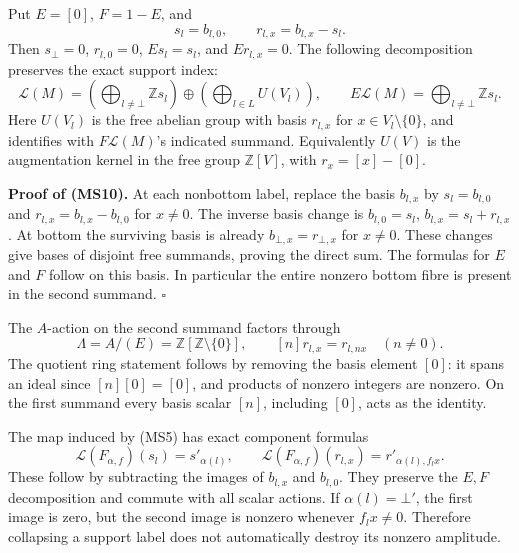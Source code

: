 \documentclass[
]{article}
\begin{document}
Put \(E=[0]\), \(F=1-E\), and \[
s_l=b_{l,0},\qquad r_{l,x}=b_{l,x}-s_l.
\tag{MS9}
\] Then \(s_\bot=0\), \(r_{l,0}=0\), \(Es_l=s_l\), and \(Er_{l,x}=0\).
The following decomposition preserves the exact support index: \[
\mathscr L(M)
=\left(\bigoplus_{l\ne\bot}\mathbb Zs_l\right)
\oplus
\left(\bigoplus_{l\in L}U(V_l)\right),
\qquad
E\mathscr L(M)=\bigoplus_{l\ne\bot}\mathbb Zs_l.
\tag{MS10}
\] Here \(U(V_l)\) is the free abelian group with basis \(r_{l,x}\) for
\(x\in V_l\setminus\{0\}\), and identifies with \(F\mathscr L(M)\)'s
indicated summand. Equivalently \(U(V)\) is the augmentation kernel in
the free group \(\mathbb Z[V]\), with \(r_x=[x]-[0]\).

\textbf{Proof of (MS10).} At each nonbottom label, replace the basis
\(b_{l,x}\) by \(s_l=b_{l,0}\) and \(r_{l,x}=b_{l,x}-b_{l,0}\) for
\(x\ne0\). The inverse basis change is \(b_{l,0}=s_l\),
\(b_{l,x}=s_l+r_{l,x}\). At bottom the surviving basis is already
\(b_{\bot,x}=r_{\bot,x}\) for \(x\ne0\). These changes give bases of
disjoint free summands, proving the direct sum. The formulas for \(E\)
and \(F\) follow on this basis. In particular the entire nonzero bottom
fibre is present in the second summand. \(\square\)

The \(A\)-action on the second summand factors through \[
\Lambda=A/(E)=\mathbb Z[\mathbb Z\setminus\{0\}],
\qquad [n]r_{l,x}=r_{l,nx}\quad(n\ne0).
\tag{MS11}
\] The quotient ring statement follows by removing the basis element
\([0]\): it spans an ideal since \([n][0]=[0]\), and products of nonzero
integers are nonzero. On the first summand every basis scalar \([n]\),
including \([0]\), acts as the identity.

The map induced by (MS5) has exact component formulas \[
\mathscr L(F_{\alpha,f})(s_l)=s'_{\alpha(l)},
\qquad
\mathscr L(F_{\alpha,f})(r_{l,x})=r'_{\alpha(l),f_lx}.
\tag{MS12}
\] These follow by subtracting the images of \(b_{l,x}\) and
\(b_{l,0}\). They preserve the \(E,F\) decomposition and commute with
all scalar actions. If \(\alpha(l)=\bot'\), the first image is zero, but
the second image is nonzero whenever \(f_lx\ne0\). Therefore collapsing
a support label does not automatically destroy its nonzero amplitude.
\end{document}
